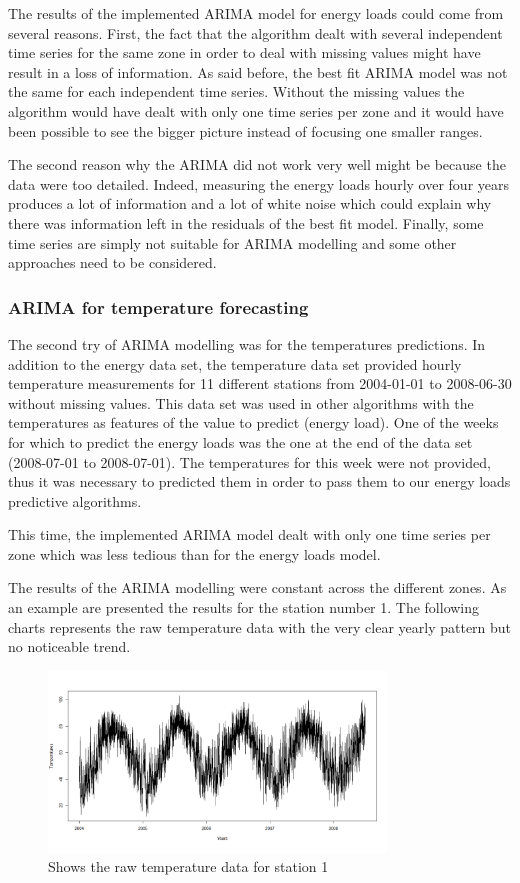 \documentclass{article} %
\begin{document}
The results of the implemented ARIMA model for energy loads could come from several reasons. First, the fact that the algorithm dealt with several independent time series for the same zone in order to deal with missing values might have result in a loss of information. As said before, the best fit ARIMA model was not the same for each independent time series. Without the missing values the algorithm would have dealt with only one time series per zone and it would have been possible to see the bigger picture instead of focusing one smaller ranges.

The second reason why the ARIMA did not work very well might be because the data were too detailed. Indeed, measuring the energy loads hourly over four years produces a lot of information and a lot of white noise which could explain why there was information left in the residuals of the best fit model. Finally, some time series are simply not suitable for ARIMA modelling and some other approaches need to be considered.


\subsubsection*{ARIMA for temperature forecasting}

The second try of ARIMA modelling was for the temperatures predictions. In addition to the energy data set, the temperature data set provided hourly temperature measurements for 11 different stations from 2004-01-01 to 2008-06-30 without missing values. This data set was used in other algorithms with the temperatures as features of the value to predict (energy load). One of the weeks for which to predict the energy loads was the one at the end of the data set (2008-07-01 to 2008-07-01). The temperatures for this week were not provided, thus it was necessary to predicted them in order to pass them to our energy loads predictive algorithms.

This time, the implemented ARIMA model dealt with only one time series per zone which was less tedious than for the energy loads model.

The results of the ARIMA modelling were constant across the different zones. As an example are presented the results for the station number 1.
The following charts represents the raw temperature data with the very clear yearly pattern but no noticeable trend.

\begin{figure}[H]
  \centering
    \includegraphics[width=0.80\textwidth]{TempRawData}
  \caption{Shows the raw temperature data for station 1 }
\end{figure}
\end{document}
